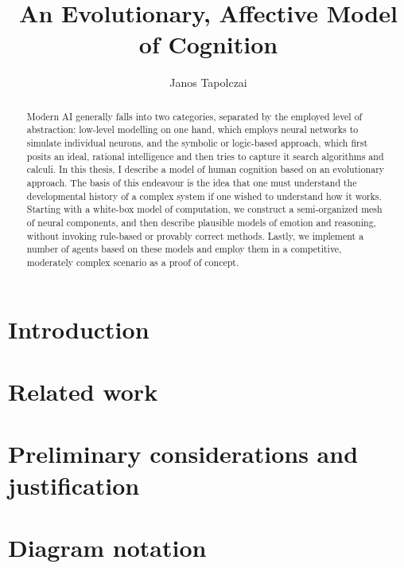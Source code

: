 \documentclass[]{scrartcl}
\title{{\huge An Evolutionary, Affective Model of Cognition}}
\author{Janos Tapolczai}
\begin{document}
\maketitle


\begin{abstract}
Modern AI generally falls into two categories, separated by the employed level of abstraction: low-level modelling on one hand, which employs neural networks to simulate individual neurons, and the symbolic or logic-based approach, which first posits an ideal, rational intelligence and then tries to capture it search algorithms and calculi. In this thesis, I describe a model of human cognition based on an evolutionary approach. The basis of this endeavour is the idea that one must understand the developmental history of a complex system if one wished to understand how it works. Starting with a white-box model of computation, we construct a semi-organized mesh of neural components, and then describe plausible models of emotion and reasoning, without invoking rule-based or provably correct methods. Lastly, we implement a number of agents based on these models and employ them in a competitive, moderately complex scenario as a proof of concept.
\end{abstract}

\newpage

\tableofcontents
\newpage

\begingroup
\let\clearpage\relax

\section{Introduction}



\section{Related work}

\section{Preliminary considerations and justification}\label{sec:preliminaries}



\section{Diagram notation}


\end{document}
